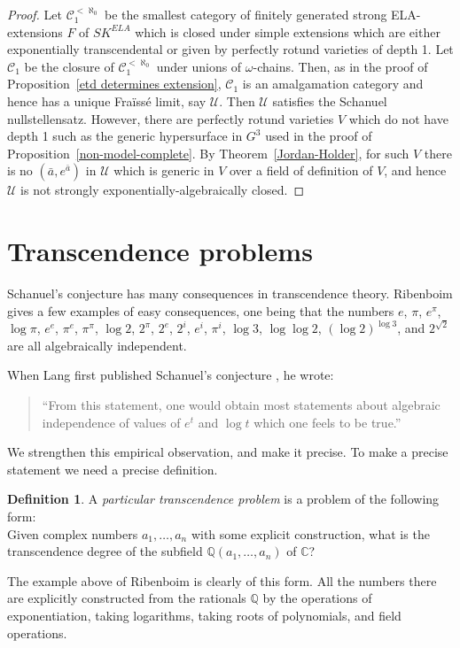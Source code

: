 \documentclass[12pt]{amsart}
\theoremstyle{definition}
\newtheorem{defn}[prop]{Definition}
\begin{document}
\begin{proof}
Let ${\ensuremath{\mathcal{C}}}_1^{<\aleph_0}$ be the smallest category of finitely generated strong ELA-extensions $F$ of $SK^{ELA}$ which is closed under simple extensions which are either exponentially transcendental or given by perfectly rotund varieties of depth 1. Let ${\ensuremath{\mathcal{C}}}_1$ be the closure of ${\ensuremath{\mathcal{C}}}_1^{<\aleph_0}$ under unions of $\omega$-chains. Then, as in the proof of Proposition~\ref{etd determines extension}, ${\ensuremath{\mathcal{C}}}_1$ is an amalgamation category and hence has a unique Fra\"iss\'e limit, say $\mathcal{U}$. Then $\mathcal{U}$ satisfies the Schanuel nullstellensatz. However, there are perfectly rotund varieties $V$ which do not have depth 1 such as the generic hypersurface in $G^3$ used in the proof of Proposition~\ref{non-model-complete}. By Theorem~\ref{Jordan-Holder}, for such $V$ there is no $({{\ensuremath{\bar{a}}}},e^{{\ensuremath{\bar{a}}}})$ in $\mathcal{U}$ which is generic in $V$ over a field of definition of $V$, and hence $\mathcal{U}$ is not {strongly exponentially-algebraically closed}. 
\end{proof}

\section{Transcendence problems}

Schanuel's conjecture has many consequences in transcendence theory. Ribenboim \cite[pp323--326]{Ribenboim00} gives a few examples of easy consequences, one being that the numbers $e$, $\pi$, $e^\pi$, $\log \pi$, $e^e$, $\pi^e$, $\pi^\pi$, $\log 2$, $2^\pi$, $2^e$, $2^i$, $e^i$, $\pi^i$, $\log 3$, $\log \log 2$, $(\log 2)^{\log 3}$, and $2^{\sqrt{2}}$ are all algebraically independent. 
 
When Lang first published Schanuel's conjecture \cite[p31]{Lang66}, he wrote: 
\begin{quote}
``From this statement, one would obtain most statements about algebraic independence of values of $e^t$ and $\log t$ which one feels to be true.''
\end{quote}
We strengthen this empirical observation, and make it precise. To make a precise statement we need a precise definition.
\begin{defn}
A \emph{particular transcendence problem} is a problem of the following form:\\
Given complex numbers $a_1,\ldots,a_n$ with some explicit construction, what is the transcendence degree of the subfield ${\ensuremath{\mathbb{Q}}}(a_1,\ldots,a_n)$ of ${\ensuremath{\mathbb{C}}}$?
\end{defn}
The example above of Ribenboim is clearly of this form. All the numbers there are explicitly constructed from the rationals ${\ensuremath{\mathbb{Q}}}$ by the operations of exponentiation, taking logarithms, taking roots of polynomials, and field operations.
\end{document}
